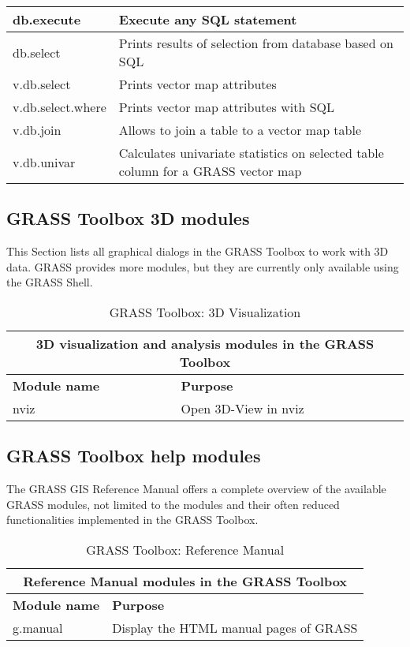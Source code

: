 \begin{table}[ht]
\begin{tabular}{|p{4cm}|p{12cm}|}
  \hline db.execute & Execute any SQL statement \\
  \hline db.select & Prints results of selection from database based on SQL \\
  \hline v.db.select & Prints vector map attributes \\
  \hline v.db.select.where & Prints vector map attributes with SQL \\
  \hline v.db.join & Allows to join a table to a vector map table \\
  \hline v.db.univar & Calculates univariate statistics on selected table
  column for a GRASS vector map \\
\hline
\end{tabular}
\end{table}

\clearpage

\subsection{GRASS Toolbox 3D modules}

This Section lists all graphical dialogs in the GRASS Toolbox to work with 3D 
data. GRASS provides more modules, but they are currently only available using 
the GRASS Shell.

\begin{table}[ht]
\centering
\caption{GRASS Toolbox: 3D Visualization}\medskip
 \begin{tabular}{|p{4cm}|p{12cm}|}
  \hline \multicolumn{2}{|c|}{\textbf{3D visualization and analysis modules in the GRASS
  Toolbox}} \\
  \hline \textbf{Module name} & \textbf{Purpose} \\
  \hline nviz & Open 3D-View in nviz\\
\hline
\end{tabular}
\end{table}

\subsection{GRASS Toolbox help modules}

The GRASS GIS Reference Manual offers a complete overview of the available 
GRASS modules, not limited to the modules and their often reduced functionalities 
implemented in the GRASS Toolbox. 

\begin{table}[ht]
\centering
\caption{GRASS Toolbox: Reference Manual}\medskip
 \begin{tabular}{|p{4cm}|p{12cm}|}
  \hline \multicolumn{2}{|c|}{\textbf{Reference Manual modules in the GRASS
  Toolbox}} \\
  \hline \textbf{Module name} & \textbf{Purpose} \\
  \hline g.manual & Display the HTML manual pages of GRASS \\
\hline
\end{tabular}
\end{table}




